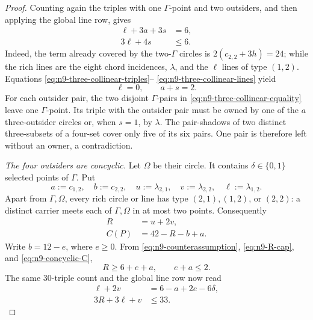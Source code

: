 \begin{proof}
Counting again the triples with one \(\Gamma\)-point and two outsiders,
and then applying the global line row, gives
\begin{align}
 \ell+3a+3s&=6,                         \label{eq:n9-three-collinear-triples}\\
 3\ell+4s&\leq6.                        \label{eq:n9-three-collinear-lines}
\end{align}
Indeed, the term already covered by the two-\(\Gamma\) circles is
\(2(c_{2,2}+3h)=24\); while the rich lines are the eight chord incidences,
\(\lambda\), and the \(\ell\) lines of type \((1,2)\).
Equations \eqref{eq:n9-three-collinear-triples}--%
\eqref{eq:n9-three-collinear-lines} yield
\[
 \ell=0,\qquad a+s=2.
\]
For each outsider pair, the two disjoint \(\Gamma\)-pairs in
\eqref{eq:n9-three-collinear-equality} leave one \(\Gamma\)-point.  Its
triple with the outsider pair must be owned by one of the \(a\)
three-outsider circles or, when \(s=1\), by \(\lambda\).
The pair-shadows of two distinct three-subsets of a four-set cover only
five of its six pairs.  One pair is therefore left without an owner, a
contradiction.

\emph{The four outsiders are concyclic.}
Let \(\Omega\) be their circle.  It contains \(\delta\in\{0,1\}\) selected
points of \(\Gamma\).  Put
\[
 a:=c_{1,2},\quad b:=c_{2,2},\quad
 u:=\lambda_{2,1},\quad v:=\lambda_{2,2},\quad
 \ell:=\lambda_{1,2}.
\]
Apart from \(\Gamma,\Omega\), every rich circle or line has type
\((2,1),(1,2)\), or \((2,2)\): a distinct carrier meets each of
\(\Gamma,\Omega\) in at most two points.  Consequently
\begin{align}
 R&=u+2v,                                                   \label{eq:n9-concyclic-R}\\
 C(P)&=42-R-b+a.                                           \label{eq:n9-concyclic-C}
\end{align}
Write \(b=12-e\), where \(e\geq0\).  From
\eqref{eq:n9-counterassumption}, \eqref{eq:n9-R-cap}, and
\eqref{eq:n9-concyclic-C},
\begin{equation}\label{eq:n9-concyclic-master}
 R\geq6+e+a,\qquad e+a\leq2.
\end{equation}
The same \(30\)-triple count and the global line row now read
\begin{align}
 \ell+2v&=6-a+2e-6\delta,                 \label{eq:n9-concyclic-triples}\\
 3R+3\ell+v&\leq33.                       \label{eq:n9-concyclic-lines}
\end{align}


\end{proof}
